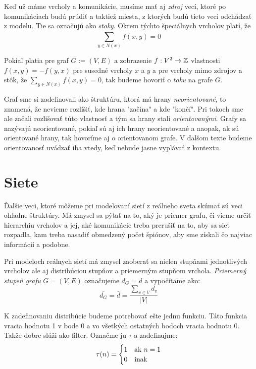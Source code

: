 Keď už máme vrcholy a komunikácie, musíme mať aj \emph{zdroj} vecí, ktoré po 
komunikáciach budú prúdiť a taktiež miesta, z ktorých budú tieto veci odchádzať 
z modelu. Tie sa označujú ako \emph{stoky}. Okrem týchto špeciálnych vrcholov 
platí, že $$\sum_{y\in N(x)}^{}{f(x,y) = 0}$$

Pokiaľ platia pre graf $G := (V, E)$ a zobrazenie $f:V^2\rightarrow\mathbb{Z}$ 
vlastnosti $f(x,y) = -f(y,x)$ pre susedné vrcholy $x$ a $y$ a pre vrcholy mimo 
zdrojov a stôk, že $\sum_{y\in N(x)}^{}{f(x,y) = 0}$, tak budeme hovoriť o 
\emph{toku} na grafe $G$.

Graf sme si zadefinovali ako štruktúru, ktorá má hrany \emph{neorientované}, 
to znamená, že nevieme rozlíšiť, kde hrana "začína" a kde "končí". Pri tokoch 
sme ale začali rozlišovať túto vlastnosť a tým sa hrany stali 
\emph{orientovanými}. Grafy sa nazývajú neorientované, pokiaľ sú aj ich hrany 
neorientované a naopak, ak sú orientované hrany, tak hovoríme aj o 
orientovanom grafe. V ďalšom texte budeme orientovanosť uvádzať iba vtedy, keď 
nebude jasne vyplávať z kontextu.

\section{Siete}

Ďalšie veci, ktoré môžeme pri modelovaní sietí z reálneho sveta skúmať sú 
veci ohľadne štruktúry. Má zmysel sa pýtať na to, aký je priemer grafu, či vieme 
určiť hierarchiu vrcholov a jej, aké komunikácie treba prerušiť na to, aby 
sa sieť rozpadla, kam treba nasadiť obmedzený počet špiónov, aby sme získali čo 
najviac informácií a podobne.

Pri modeloch reálnych sietí má zmysel zaoberať sa nielen stupňami jednotlivých 
vrcholov ale aj distribúciou stupňov a priemerným stupňom vrchola. 
\emph{Priemerný stupeň grafu} $G = (V, E)$ označujeme $\overline{d_G} = \bar{d}$ a 
vypočítame ako: $$\overline{d_G} = \bar{d} = \frac{\sum_{v \in V}^{}{d_v}}{|V|}$$

K zadefinovaniu distribúcie budeme potrebovať ešte jednu funkciu. Táto funkcia 
vracia hodnotu 1 v bode 0 a vo všetkých ostatných bodoch vracia hodnotu 0. 
Takže dobre slúži ako filter. Označme ju $\tau$ a zadefinujme: 
$$\tau (n) = \begin{cases}
\hfill 1 \hfill & \text{ak $n=1$} \\
\hfill 0 \hfill & \text{inak} \\
\end{cases}$$

